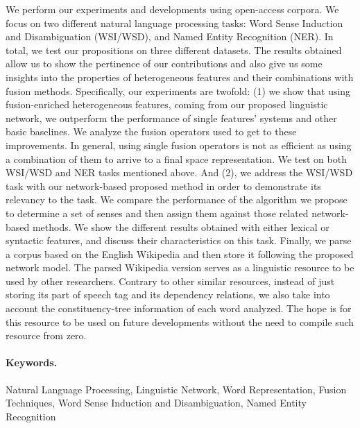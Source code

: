 \documentclass[a4paper,11pt,twoside]{ThesisStyle}
\begin{document}
We perform our experiments and developments using open-access corpora. We focus on two different natural language processing tasks: Word Sense Induction and Disambiguation (WSI/WSD), and Named Entity Recognition (NER). In total, we test our propositions on three different datasets. The results obtained allow us to show the pertinence of our contributions and also give us some insights into the properties of heterogeneous features and their combinations with fusion methods. Specifically, our experiments are twofold: (1) we show that using fusion-enriched heterogeneous features, coming from our proposed linguistic network, we outperform the performance of single features' systems and other basic baselines. We analyze the fusion operators used to get to these improvements. In general, using single fusion operators is not as efficient as using a combination of them to arrive to a final space representation. We test on both WSI/WSD and NER tasks mentioned above. And (2), we address the WSI/WSD task with our network-based proposed method in order to demonstrate its relevancy to the task. We compare the performance of the algorithm we propose to determine a set of senses and then assign them against those related network-based methods. We show the different results obtained with either lexical or syntactic features, and discuss their characteristics on this task. Finally, we parse a corpus based on the English Wikipedia and then store it following the proposed network model. The parsed Wikipedia version serves as a linguistic resource to be used by other researchers. Contrary to other similar resources, instead of just storing its part of speech tag and its dependency relations,  we also take into account the constituency-tree information of each word analyzed. The hope is for this resource to be used on future developments without the need to compile such resource from zero.

\paragraph{Keywords.} Natural Language Processing, Linguistic Network, Word Representation, Fusion Techniques, Word Sense Induction and Disambiguation, Named Entity Recognition


%
\dominitoc



 


%

\tableofcontents
\cleardoublepage

\listoftables

\listoffigures

\mainmatter




%


%





\cleardoublepage
\end{document}
